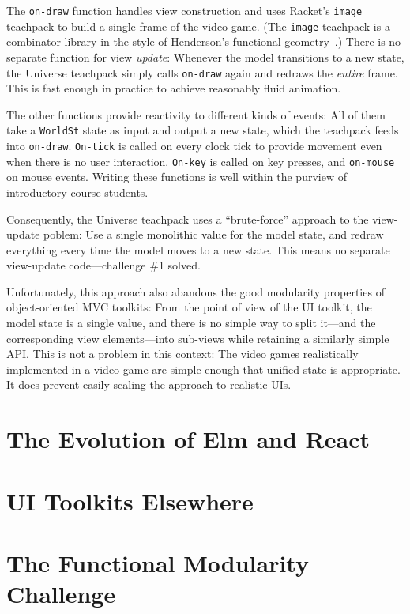 \documentclass[sigplan,screen]{acmart}
\begin{document}
The \texttt{on-draw} function handles view construction and uses Racket's
\texttt{image} teachpack to build a single frame of the video game.
(The \texttt{image} teachpack is a combinator library in the style of
Henderson's functional geometry~\cite{Henderson1982}.)  There is no
separate function for view \emph{update}: Whenever the model
transitions to a new state, the Universe teachpack simply calls
\texttt{on-draw} again and redraws the \emph{entire} frame.  This is
fast enough in practice to achieve reasonably fluid animation.

The other functions provide reactivity to different kinds of events:
All of them take a \texttt{WorldSt} state as input and output a new
state, which the teachpack feeds into \texttt{on-draw}.
\texttt{On-tick} is called on every clock tick to provide movement
even when there is no user interaction.  \texttt{On-key} is called on
key presses, and \texttt{on-mouse} on mouse events.  Writing these
functions is well within the purview of introductory-course students.

Consequently, the Universe teachpack uses a ``brute-force'' approach
to the view-update poblem: Use a single monolithic value for the model
state, and redraw everything every time the model moves to a new
state.  This means no separate view-update code---challenge \#1
solved.

Unfortunately, this approach also abandons the good modularity
properties of object-oriented MVC toolkits: From the point of view of
the UI toolkit, the model state is a single value, and there is no
simple way to split it---and the corresponding view elements---into
sub-views while retaining a similarly simple API.  This is not a
problem in this context: The video games realistically implemented in
a video game are simple enough that unified state is appropriate.  It
does prevent easily scaling the approach to realistic UIs.

%

\section{The Evolution of Elm and React}

\section{UI Toolkits Elsewhere}

\section{The Functional Modularity Challenge}
\end{document}

